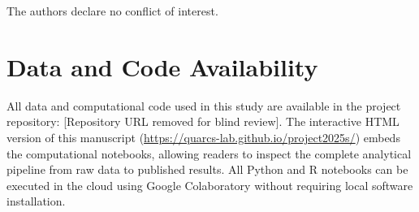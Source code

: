 \documentclass[
  letterpaper,
  DIV=11,
  numbers=noendperiod]{scrartcl}
\begin{document}
The authors declare no conflict of interest.

\section{Data and Code Availability}\label{data-and-code-availability}

All data and computational code used in this study are available in the
project repository: {[}Repository URL removed for blind review{]}. The
interactive HTML version of this manuscript
(\url{https://quarcs-lab.github.io/project2025s/}) embeds the
computational notebooks, allowing readers to inspect the complete
analytical pipeline from raw data to published results. All Python and R
notebooks can be executed in the cloud using Google Colaboratory without
requiring local software installation.
\end{document}

